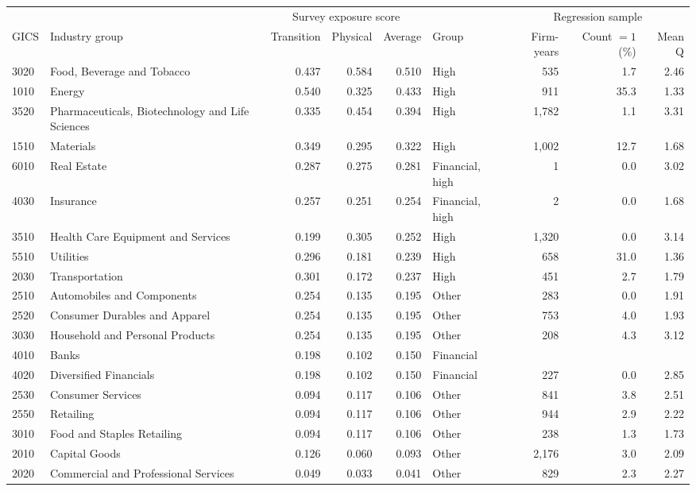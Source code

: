 \begin{tabular}{llrrrlrrr}
\toprule
 & & \multicolumn{3}{c}{Survey exposure score} & & \multicolumn{3}{c}{Regression sample} \\
\cmidrule(lr){3-5}\cmidrule(lr){7-9}
GICS & Industry group & Transition & Physical & Average & Group & Firm-years & Count $=1$ (\%) & Mean Q \\
\midrule
3020 & Food, Beverage and Tobacco & 0.437 & 0.584 & 0.510 & High & 535 & 1.7 & 2.46 \\
1010 & Energy & 0.540 & 0.325 & 0.433 & High & 911 & 35.3 & 1.33 \\
3520 & Pharmaceuticals, Biotechnology and Life Sciences & 0.335 & 0.454 & 0.394 & High & 1,782 & 1.1 & 3.31 \\
1510 & Materials & 0.349 & 0.295 & 0.322 & High & 1,002 & 12.7 & 1.68 \\
6010 & Real Estate & 0.287 & 0.275 & 0.281 & Financial, high & 1 & 0.0 & 3.02 \\
4030 & Insurance & 0.257 & 0.251 & 0.254 & Financial, high & 2 & 0.0 & 1.68 \\
3510 & Health Care Equipment and Services & 0.199 & 0.305 & 0.252 & High & 1,320 & 0.0 & 3.14 \\
5510 & Utilities & 0.296 & 0.181 & 0.239 & High & 658 & 31.0 & 1.36 \\
2030 & Transportation & 0.301 & 0.172 & 0.237 & High & 451 & 2.7 & 1.79 \\
2510 & Automobiles and Components & 0.254 & 0.135 & 0.195 & Other & 283 & 0.0 & 1.91 \\
2520 & Consumer Durables and Apparel & 0.254 & 0.135 & 0.195 & Other & 753 & 4.0 & 1.93 \\
3030 & Household and Personal Products & 0.254 & 0.135 & 0.195 & Other & 208 & 4.3 & 3.12 \\
4010 & Banks & 0.198 & 0.102 & 0.150 & Financial &  &  &  \\
4020 & Diversified Financials & 0.198 & 0.102 & 0.150 & Financial & 227 & 0.0 & 2.85 \\
2530 & Consumer Services & 0.094 & 0.117 & 0.106 & Other & 841 & 3.8 & 2.51 \\
2550 & Retailing & 0.094 & 0.117 & 0.106 & Other & 944 & 2.9 & 2.22 \\
3010 & Food and Staples Retailing & 0.094 & 0.117 & 0.106 & Other & 238 & 1.3 & 1.73 \\
2010 & Capital Goods & 0.126 & 0.060 & 0.093 & Other & 2,176 & 3.0 & 2.09 \\
2020 & Commercial and Professional Services & 0.049 & 0.033 & 0.041 & Other & 829 & 2.3 & 2.27 \\

\end{tabular}
